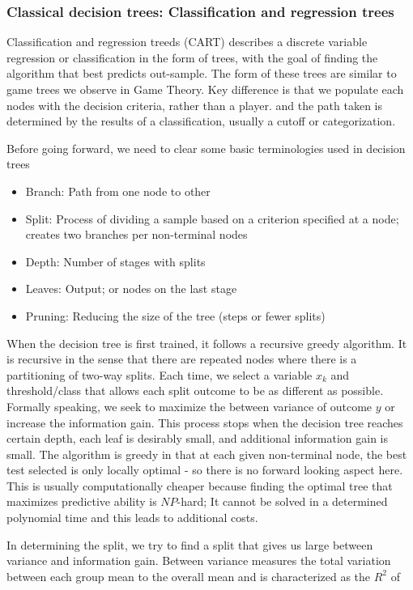 \documentclass[12pt]{article}
\theoremstyle{definition}
\theoremstyle{property}
\theoremstyle{assumption}
\theoremstyle{example}
\theoremstyle{comment}
\begin{document}
\subsubsection{Classical decision trees: Classification and regression trees}
Classification and regression treeds (CART) describes a discrete variable regression or classification in the form of trees, with the goal of finding the algorithm that best predicts out-sample. The form of these trees are similar to game trees we observe in Game Theory. Key difference is that we populate each nodes with the decision criteria, rather than a player. and the path taken is determined by the results of a classification, usually a cutoff or categorization. 
\par
Before going forward, we need to clear some basic terminologies used in decision trees
\begin{itemize}
\item Branch: Path from one node to other
\item Split: Process of dividing a sample based on a criterion specified at a node; creates two branches per non-terminal nodes
\item Depth: Number of stages with splits
\item Leaves: Output; or nodes on the last stage
\item Pruning: Reducing the size of the tree (steps or fewer splits)
\end{itemize} \par
When the decision tree is first trained, it follows a recursive greedy algorithm. It is recursive in the sense that there are repeated nodes where there is a partitioning of two-way splits. Each time, we select a variable $x_k$ and threshold/class that allows each split outcome to be as different as possible. Formally speaking, we seek to maximize the between variance of outcome $y$ or increase the information gain. This process stops when the decision tree reaches certain depth, each leaf is desirably small, and additional information gain is small. The algorithm is greedy in that at each given non-terminal node, the best test selected is only locally optimal - so there is no forward looking aspect here. This is usually computationally cheaper because finding the optimal tree that maximizes predictive ability is $NP$-hard; It cannot be solved in a determined polynomial time and this leads to additional costs. \par
In determining the split, we try to find a split that gives us large between variance and information gain. Between variance measures the total variation between each group mean to the overall mean and is characterized as the $R^2$ of
\end{document}
